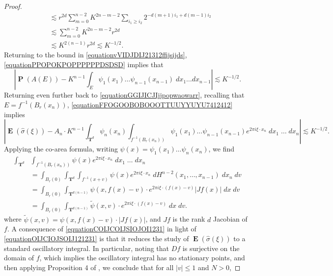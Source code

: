 \documentclass[dvipsnames,letterpaper,12pt]{article}
\numberwithin{equation}{section}
\DeclareMathOperator{\TT}{\mathbf{T}}
\numberwithin{theorem}{section}
\DeclareMathOperator{\EE}{\mathbf{E}}
\DeclareMathOperator{\PP}{\mathbf{P}}
\begin{document}
\begin{proof}
\begin{equation}
\begin{split}
        &\lesssim r^{2d} \sum_{m = 0}^{n-2} K^{2n-m-2} \sum_{i_1 \geq i_2} 2^{-d(m+1)i_1 + d(m-1)i_2}\\
        &\lesssim \sum_{m = 0}^{n-2} K^{2n-m-2} r^{2d}\\
        &\lesssim K^{2(n-1)} r^{2d} \lesssim K^{-1/2}.
    \end{split}
    \end{equation}
    Returning to the bound in \eqref{equationvVIDJDIJ21312ffijsijds}, \eqref{equationPPOPOKPOPPPPPPDSDSD} implies that
    \begin{equation} \label{equationFFOGOOBOBOOOTTUUYYUYU7412412}
        \left| \PP(A(E)) - K^{n-1} \int_E \psi_1(x_1) \dots \psi_{n-1}(x_{n-1})\; dx_1 \dots dx_{n-1} \right| \lesssim K^{-1/2}.
    \end{equation}
    Returning even further back to \eqref{equationGGIJICJIjjpopwaowarr}, recalling that $E = f^{-1}(B_r(x_n))$, \eqref{equationFFOGOOBOBOOOTTUUYYUYU7412412} implies
    \begin{equation} \label{equationOIJCIOJSOIJ121231}
        \left| \EE(\widehat{\sigma}(\xi)) - A_n \cdot K^{n-1} \int_{\TT^d} \psi_n(x_n) \int_{f^{-1}(B_r(x_n))} \psi_1(x_1) \dots \psi_{n-1}(x_{n-1}) e^{2 \pi i \xi \cdot x_n}\; dx_1\; \dots\; dx_n \right| \lesssim K^{-1/2}.
    \end{equation}
    Applying the co-area formula, writing $\psi(x) = \psi_1(x_1) \dots \psi_n(x_n)$, we find
    \begin{equation} \label{equationCOIJCOIJSIOJOI1231}
    \begin{split}
        \int_{\TT^d} & \int_{f^{-1}(B_r(x_n))} \psi(x) e^{2 \pi i \xi \cdot x_n}\; dx_1\; \dots\; dx_n\\
        &= \int_{B_r(0)} \int_{\TT^d} \int_{f^{-1}(x + v)} \psi(x) e^{2 \pi i \xi \cdot x_n}\; dH^{n-2}(x_1,\dots,x_{n-1})\; dx_n\; dv\\
        &= \int_{B_r(0)} \int_{\TT^{d(n-1)}} \psi(x,f(x) - v) \cdot e^{2 \pi i \xi \cdot (f(x) - v)} |Jf(x)|\; dx\; dv\\
        &= \int_{B_r(0)} \int_{\TT^{d(n-1)}} \tilde{\psi}(x,v) \cdot e^{2 \pi i \xi \cdot (f(x) - v)}\; dx\; dv.
    \end{split}
    \end{equation}
    where $\tilde{\psi}(x,v) = \psi(x,f(x) - v) \cdot |Jf(x)|$, and $Jf$ is the rank $d$ Jacobian of $f$. A consequence of \eqref{equationCOIJCOIJSIOJOI1231} in light of \eqref{equationOIJCIOJSOIJ121231} is that it reduces the study of $\EE(\widehat{\sigma}(\xi))$ to a standard oscillatory integral. In particular, noting that $Df$ is surjective on the domain of $f$, which implies the oscillatory integral has no stationary points, and then applying Proposition 4 of \cite{Stein}, we conclude that for all $|v| \leq 1$ and $N > 0$,

\end{proof}
\end{document}
